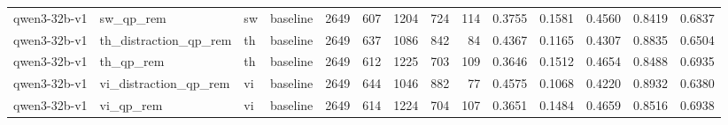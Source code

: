 \begin{table}
\begin{tabular}{llllrrrrrlllll}
qwen3-32b-v1 & sw_qp_rem & sw & baseline & 2649 & 607 & 1204 & 724 & 114 & 0.3755 & 0.1581 & 0.4560 & 0.8419 & 0.6837 \\
qwen3-32b-v1 & th_distraction_qp_rem & th & baseline & 2649 & 637 & 1086 & 842 & 84 & 0.4367 & 0.1165 & 0.4307 & 0.8835 & 0.6504 \\
qwen3-32b-v1 & th_qp_rem & th & baseline & 2649 & 612 & 1225 & 703 & 109 & 0.3646 & 0.1512 & 0.4654 & 0.8488 & 0.6935 \\
qwen3-32b-v1 & vi_distraction_qp_rem & vi & baseline & 2649 & 644 & 1046 & 882 & 77 & 0.4575 & 0.1068 & 0.4220 & 0.8932 & 0.6380 \\
qwen3-32b-v1 & vi_qp_rem & vi & baseline & 2649 & 614 & 1224 & 704 & 107 & 0.3651 & 0.1484 & 0.4659 & 0.8516 & 0.6938 \\
\bottomrule
\end{tabular}
\end{table}
